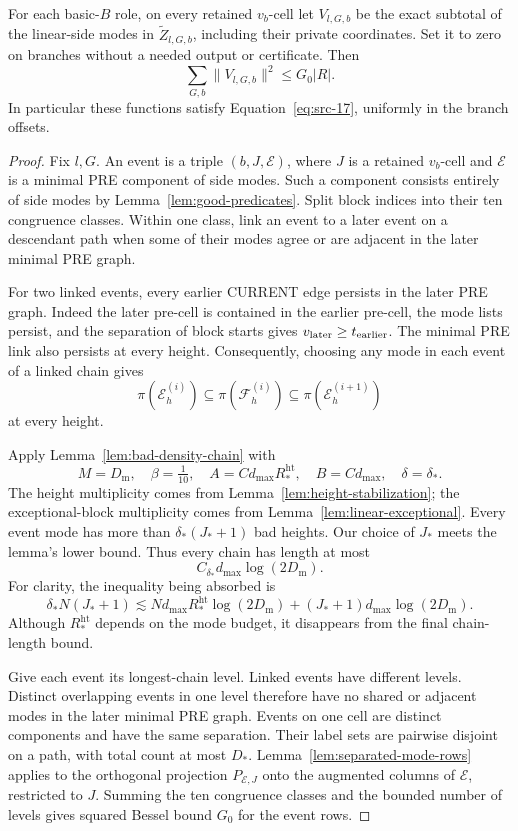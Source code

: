 \begin{proposition}
\label{prop:linear-side}
For each basic-\(B\) role, on every retained \(v_b\)-cell let
\(V_{l,G,b}\) be the exact subtotal of the linear-side modes in
\(\widetilde Z_{l,G,b}\), including their private coordinates.
Set it to zero on branches without a needed output or certificate.
Then
\[
 \sum_{G,b}\|V_{l,G,b}\|^2\le G_0|R|.
\]
In particular these functions satisfy Equation~\eqref{eq:src-17},
uniformly in the branch offsets.
\end{proposition}

\begin{proof}
Fix \(l,G\).  An event is a triple \((b,J,\mathcal E)\), where
\(J\) is a retained \(v_b\)-cell and \(\mathcal E\) is a minimal
PRE component of side modes.  Such a component consists entirely
of side modes by Lemma~\ref{lem:good-predicates}.
Split block indices into their ten congruence classes.
Within one class, link an event to a later event on a descendant
path when some of their modes agree or are adjacent in the later
minimal PRE graph.

For two linked events, every earlier CURRENT edge persists in the
later PRE graph.  Indeed the later pre-cell is contained in the
earlier pre-cell, the mode lists persist, and the separation of
block starts gives \(v_{\rm later}\ge t_{\rm earlier}\).
The minimal PRE link also persists at every height.
Consequently, choosing any mode in each event of a linked chain
gives
\[
 \pi(\mathcal E^{(i)}_h)
 \subseteq\pi(\mathcal F^{(i)}_h)
 \subseteq\pi(\mathcal E^{(i+1)}_h)
\]
at every height.

Apply Lemma~\ref{lem:bad-density-chain} with
\[
 M=D_{\mathrm m},\quad \beta=\tfrac1{10},\quad
 A=C d_{\max}R_*^{\mathrm{ht}},\quad B=C d_{\max},
 \quad\delta=\delta_*.
\]
The height multiplicity comes from
Lemma~\ref{lem:height-stabilization}; the exceptional-block
multiplicity comes from Lemma~\ref{lem:linear-exceptional}.
Every event mode has more than \(\delta_*(J_*+1)\) bad heights.
Our choice of \(J_*\) meets the lemma's lower bound.  Thus every
chain has length at most
\[
 C_{\delta_*}d_{\max}\log(2D_{\mathrm m}).
\]
For clarity, the inequality being absorbed is
\[
 \delta_*N(J_*+1)
 \lesssim N d_{\max}R_*^{\mathrm{ht}}\log(2D_{\mathrm m})
       +(J_*+1)d_{\max}\log(2D_{\mathrm m}).
\]
Although \(R_*^{\mathrm{ht}}\) depends on the mode budget, it
disappears from the final chain-length bound.

Give each event its longest-chain level.  Linked events have
different levels.  Distinct overlapping events in one level
therefore have no shared or adjacent modes in the later minimal
PRE graph.  Events on one cell are distinct components and have
the same separation.  Their label sets are pairwise disjoint on
a path, with total count at most \(D_*\).
Lemma~\ref{lem:separated-mode-rows} applies to the orthogonal
projection \(P_{\mathcal E,J}\) onto the augmented columns of
\(\mathcal E\), restricted to \(J\).
Summing the ten congruence classes and the bounded number of levels
gives squared Bessel bound \(G_0\) for the event rows.


\end{proof}

